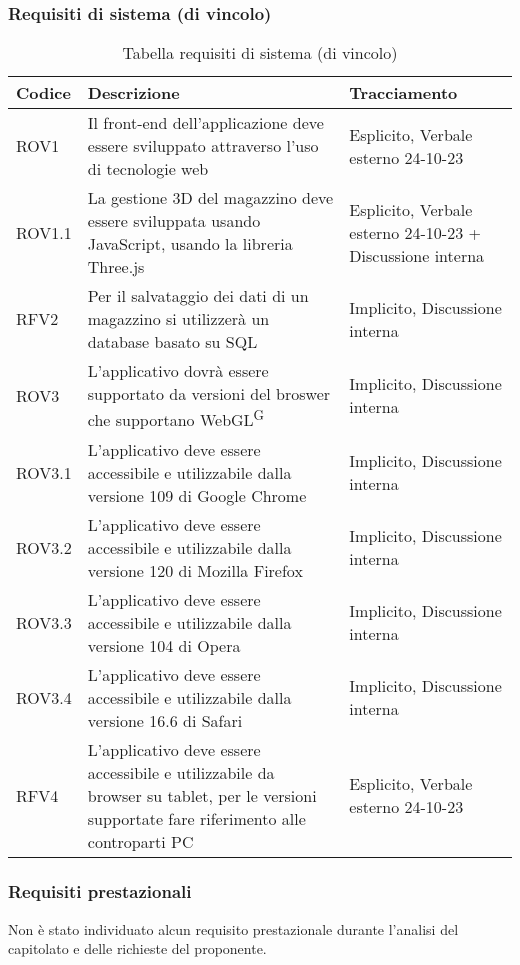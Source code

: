 \subsubsection{Requisiti di sistema (di vincolo)}\label{subsec:requisiti_vincolo}
\begin{xltabular}{\textwidth}{ p{0.1\textwidth} | X | p{0.3\textwidth} }
    \textbf{\color{white} Codice} & \textbf{\color{white} Descrizione} & \textbf{\color{white} Tracciamento} \\ 
    \endhead

    \caption{Tabella requisiti di sistema (di vincolo)}
    \endlastfoot

    ROV1 & Il front-end dell'applicazione deve essere sviluppato attraverso l'uso di tecnologie web & Esplicito, Verbale esterno 24-10-23 \\
    ROV1.1 & La gestione 3D del magazzino deve essere sviluppata usando JavaScript, usando la libreria Three.js & Esplicito, Verbale esterno 24-10-23 + Discussione interna \\
    RFV2 & Per il salvataggio dei dati di un magazzino si utilizzerà un database basato su SQL & Implicito, Discussione interna\\
    ROV3 & L'applicativo dovrà essere supportato da versioni del broswer che supportano WebGL\textsuperscript{G} & Implicito, Discussione interna\\
    ROV3.1 & L'applicativo deve essere accessibile e utilizzabile dalla versione 109 di Google Chrome & Implicito, Discussione interna\\
    ROV3.2 & L'applicativo deve essere accessibile e utilizzabile dalla versione 120 di Mozilla Firefox & Implicito, Discussione interna\\
    ROV3.3 & L'applicativo deve essere accessibile e utilizzabile dalla versione 104 di Opera & Implicito, Discussione interna\\
    ROV3.4 & L'applicativo deve essere accessibile e utilizzabile dalla versione 16.6 di Safari & Implicito, Discussione interna\\
    RFV4 & L'applicativo deve essere accessibile e utilizzabile da browser su tablet, per le versioni supportate fare riferimento alle controparti PC & Esplicito, Verbale esterno 24-10-23\\

    \hline
\end{xltabular}

\subsubsection{Requisiti prestazionali}\label{subsec:requisiti_prestazionali}
Non è stato individuato alcun requisito prestazionale durante l’analisi del capitolato e delle richieste del proponente.

